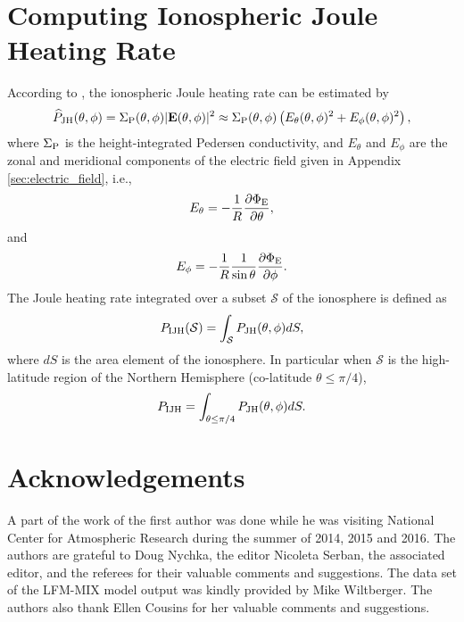 \documentclass[aoas,preprint]{imsart}
\numberwithin{equation}{section}
\theoremstyle{plain}
\begin{document}
\section{Computing Ionospheric Joule Heating Rate}\label{sec:Joule}
According to \citet{Palmroth-05}, the ionospheric Joule heating rate can be estimated by 
$$\widehat{P}_{\rm JH}(\theta, \phi)=\Sigma_{\rm P}(\theta, \phi)|\mathbf{E}(\theta, \phi)|^2 \approx \Sigma_{\rm P}(\theta, \phi)\left( E_\theta(\theta, \phi)^2+E_\phi(\theta, \phi)^2 \right),$$
where $\Sigma_{\rm P}$ is the height-integrated Pedersen conductivity, and $E_\theta$ and $E_\phi$ are the zonal and meridional components of the electric field given in Appendix \ref{sec:electric_field}, i.e., 
$$E_\theta=-\frac{1}{R}\frac{\partial \Phi_{\rm E}}{\partial \theta},$$
and
$$E_\phi=-\frac{1}{R} \frac{1}{\sin \theta} \frac{\partial \Phi_{\rm E}}{\partial \phi}.$$
The Joule heating rate integrated over a subset $\mathcal{S}$ of the ionosphere is defined as
$$P_{\rm IJH}(\mathcal{S}) = \int_{\mathcal{S}}P_{\rm JH}(\theta, \phi)dS,$$ where 
$dS$ is the area element of the ionosphere. In particular when $\mathcal{S}$ is the high-latitude region of the Northern Hemisphere (co-latitude $\theta \leq \pi/4$),
$$P_{\rm IJH}= \int_{\theta \leq \pi/4}P_{\rm JH}(\theta, \phi)dS.$$


\section*{Acknowledgements}
A part of the work of the first author was done while he was visiting National Center for Atmospheric Research during the summer of 2014, 2015 and 2016. The authors are grateful to Doug Nychka, the editor Nicoleta Serban, the associated editor, and the referees for their valuable comments and suggestions. The data set of the LFM-MIX model output was kindly provided by Mike Wiltberger. The authors also thank Ellen Cousins for her valuable comments and suggestions.

\begin{supplement}
\end{supplement}




\end{document}
